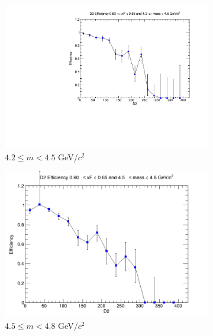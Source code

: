 \begin{figure}[p]
    \centering
    \begin{subfigure}[b]{0.32\textwidth}
        \centering
        \includegraphics[width=\textwidth]{./kTrackerEfficiencyPlots/D2_Efficiency_xF12_mass0.pdf}
        \caption{$4.2 \leq m < 4.5$ GeV/$c^2$}
        \label{fig:xF12_mass0}
    \end{subfigure}
    \hfill
    \begin{subfigure}[b]{0.32\textwidth}
        \centering
        \includegraphics[width=\textwidth]{./kTrackerEfficiencyPlots/D2_Efficiency_xF12_mass1.png}
        \caption{$4.5 \leq m < 4.8$ GeV/$c^2$}
        \label{fig:xF12_mass1}
    \end{subfigure}
    \hfill
    \begin{subfigure}[b]{0.32\textwidth}

\end{subfigure}
\end{figure}
